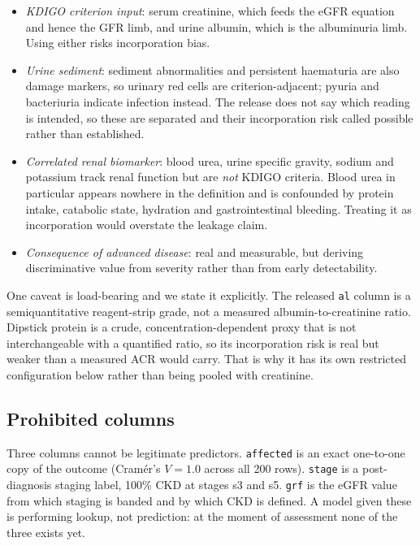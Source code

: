\documentclass[conference]{IEEEtran}
\begin{document}
\begin{itemize}
  \item \emph{KDIGO criterion input}: serum creatinine, which feeds the eGFR
        equation and hence the GFR limb, and urine albumin, which is the
        albuminuria limb. Using either risks incorporation bias.
  \item \emph{Urine sediment}: sediment abnormalities and persistent
        haematuria are also damage markers, so urinary red cells are
        criterion-adjacent; pyuria and bacteriuria indicate infection
        instead. The release does not say which reading is intended, so
        these are separated and their incorporation risk called possible
        rather than established.
  \item \emph{Correlated renal biomarker}: blood urea, urine specific
        gravity, sodium and potassium track renal function but are
        \emph{not} KDIGO criteria. Blood urea in particular appears nowhere
        in the definition and is confounded by protein intake, catabolic
        state, hydration and gastrointestinal bleeding. Treating it as
        incorporation would overstate the leakage claim.
  \item \emph{Consequence of advanced disease}: real and measurable, but
        deriving discriminative value from severity rather than from early
        detectability.
\end{itemize}

One caveat is load-bearing and we state it explicitly. The released
\texttt{al} column is a semiquantitative reagent-strip grade, not a measured
albumin-to-creatinine ratio. Dipstick protein is a crude,
concentration-dependent proxy that is not interchangeable with a quantified
ratio, so its incorporation risk is real but weaker than a measured ACR
would carry. That is why it has its own restricted configuration below
rather than being pooled with creatinine.



\subsection{Prohibited columns}

Three columns cannot be legitimate predictors. \texttt{affected} is an exact
one-to-one copy of the outcome (Cram\'er's $V = 1.0$ across all 200 rows).
\texttt{stage} is a post-diagnosis staging label, 100\% CKD at stages s3 and
s5. \texttt{grf} is the eGFR value from which staging is banded and by which
CKD is defined. A model given these is performing lookup, not prediction: at
the moment of assessment none of the three exists yet.
\end{document}
